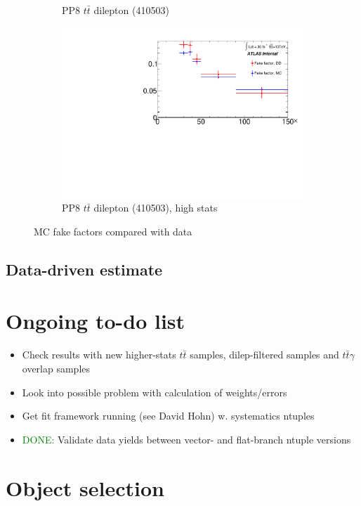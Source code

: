 \documentclass[11pt]{article}
\begin{document}
\begin{figure}[H]
\begin{subfigure}[b]{.5\textwidth}
			\caption{PP8 $t\bar{t}$ dilepton (410503)}
		\end{subfigure}
		\quad
		\begin{subfigure}[b]{.5\textwidth}
			\includegraphics[width=0.82\linewidth]{figures/FakesEstimate_data_pp8_dilepton_new/Overlay_FF_tau_pt_data.pdf}
			\caption{PP8 $t\bar{t}$ dilepton (410503), high stats}
		\end{subfigure}
		\caption{MC fake factors compared with data}
	\end{figure}
	


	
	
	\clearpage
	\subsection{Data-driven estimate} 
	
	\clearpage
	\section{Ongoing to-do list} 
	\begin{itemize} 	
		\item Check results with new higher-stats $t\bar{t}$ samples, dilep-filtered samples and $t\bar{t}\gamma$ overlap samples
		\item Look into possible problem with calculation of weights/errors 
		\item Get fit framework running (see David Hohn) w. systematics ntuples 
		\item \textcolor{green}{DONE:} Validate data yields between vector- and flat-branch ntuple versions 
	\end{itemize} 
	
	
	\clearpage
	\section{Object selection}
	
\end{document}
